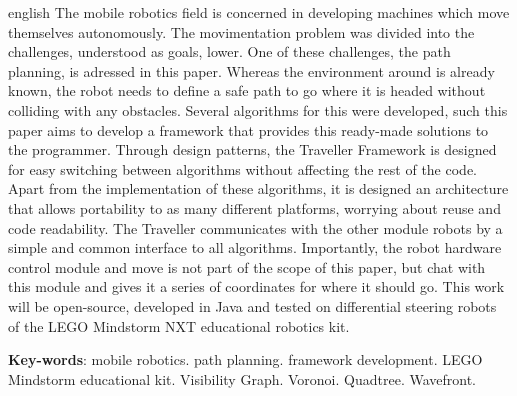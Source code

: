 \begin{resumo}[Abstract]
 \begin{otherlanguage*}{english}
   The mobile robotics field is concerned in developing machines which move themselves autonomously. The movimentation problem was divided into the challenges, understood as goals, lower. One of these challenges, the path planning, is adressed in this paper. Whereas  the environment around is already known, the robot needs to define a safe path to go where it is headed without colliding with any obstacles. Several algorithms for this were developed, such this paper aims to develop a framework that provides this ready-made solutions to the programmer. Through design patterns, the Traveller Framework is designed for easy switching between algorithms without affecting the rest of the code. Apart from the implementation of these algorithms, it is designed an architecture that allows portability to as many different platforms, worrying about reuse and code readability. The Traveller communicates with the other module robots by a simple and common interface to all algorithms. Importantly, the robot hardware control module and move is not part of the scope of this paper, but chat with this module and gives it a series of coordinates for where it should go. This work will be open-source, developed in Java and tested on differential steering robots of  the LEGO Mindstorm NXT educational robotics kit.

   \vspace{\onelineskip}
 
   \noindent 
   \textbf{Key-words}: mobile robotics. path planning. framework development. LEGO Mindstorm educational kit. Visibility Graph. Voronoi. Quadtree. Wavefront.
 \end{otherlanguage*}
\end{resumo}
